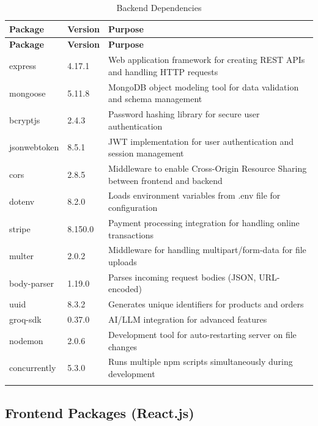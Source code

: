 \documentclass[12pt,a4paper]{article}
\begin{document}
\begin{longtable}{@{}p{3.5cm}p{1.5cm}p{8cm}@{}}
\toprule
\textbf{Package} & \textbf{Version} & \textbf{Purpose} \\
\midrule
\endfirsthead
\toprule
\textbf{Package} & \textbf{Version} & \textbf{Purpose} \\
\midrule
\endhead
express & 4.17.1 & Web application framework for creating REST APIs and handling HTTP requests \\
\midrule
mongoose & 5.11.8 & MongoDB object modeling tool for data validation and schema management \\
\midrule
bcryptjs & 2.4.3 & Password hashing library for secure user authentication \\
\midrule
jsonwebtoken & 8.5.1 & JWT implementation for user authentication and session management \\
\midrule
cors & 2.8.5 & Middleware to enable Cross-Origin Resource Sharing between frontend and backend \\
\midrule
dotenv & 8.2.0 & Loads environment variables from .env file for configuration \\
\midrule
stripe & 8.150.0 & Payment processing integration for handling online transactions \\
\midrule
multer & 2.0.2 & Middleware for handling multipart/form-data for file uploads \\
\midrule
body-parser & 1.19.0 & Parses incoming request bodies (JSON, URL-encoded) \\
\midrule
uuid & 8.3.2 & Generates unique identifiers for products and orders \\
\midrule
groq-sdk & 0.37.0 & AI/LLM integration for advanced features \\
\midrule
nodemon & 2.0.6 & Development tool for auto-restarting server on file changes \\
\midrule
concurrently & 5.3.0 & Runs multiple npm scripts simultaneously during development \\
\bottomrule
\caption{Backend Dependencies}
\end{longtable}

\subsection{Frontend Packages (React.js)}
\end{document}
